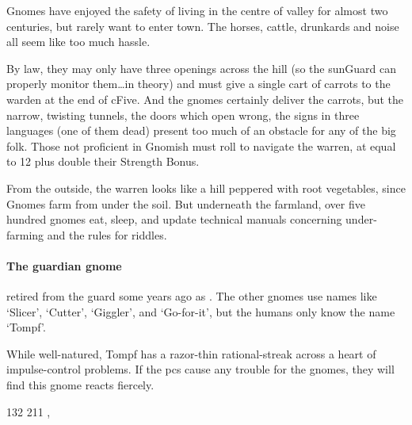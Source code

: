 \begin{multicols}{2}
\noindent
Gnomes have enjoyed the safety of living in the centre of \gls{valley} for almost two centuries, but rarely want to enter \gls{town}.
The horses, cattle, drunkards and noise all seem like too much hassle.

By law, they may only have three openings across the hill (so the \gls{sunGuard} can properly monitor them\ldots in theory) and must give a single cart of carrots to the \gls{warden} at the end of \gls{cFive}.
And the gnomes certainly deliver the carrots, but the narrow, twisting tunnels, the doors which open wrong, the signs in three languages (one of them dead) present too much of an obstacle for any of the big folk.
Those not proficient in Gnomish must roll  to navigate the warren, at  equal to 12 plus double their Strength Bonus.

From the outside, the warren looks like a hill peppered with root vegetables, since Gnomes farm from under the soil.%
But underneath the farmland, over five hundred gnomes eat, sleep, and update technical manuals concerning under-farming and the rules for riddles.

\paragraph{The guardian gnome}
retired from the \gls{guard} some years ago as .
The other gnomes use names like `Slicer', `Cutter', `Giggler', and `Go-for-it', but the humans only know the name `Tompf'.

While well-natured, Tompf has a razor-thin rational-streak across a heart of impulse-control problems.
If the \glspl{pc} cause any trouble for the gnomes, they will find this gnome reacts fiercely.

%
  {{1}{3}{2}}%
  {{2}{1}{1}}%
  {%
    \rapier
    \partialleather
  }%
  {\weaponmaster, \guardian}%
  {\rations}%
  {}%

\end{multicols}

